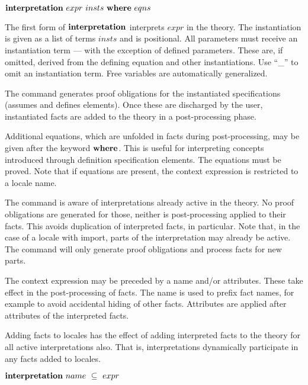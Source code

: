 \begin{descr}

\item [${\mathord{\mathbf{interpretation}}}~expr~insts~{\mathord{\mathbf{where}}}~eqns$]

  The first form of ${\mathord{\mathbf{interpretation}}}$ interprets $expr$ in
  the theory.  The instantiation is given as a list of terms $insts$
  and is positional.  All parameters must receive an instantiation
  term --- with the exception of defined parameters.  These are, if
  omitted, derived from the defining equation and other
  instantiations.  Use ``\_'' to omit an instantiation term.  Free
  variables are automatically generalized.

  The command generates proof obligations for the instantiated
  specifications (assumes and defines elements).  Once these are
  discharged by the user, instantiated facts are added to the theory in
  a post-processing phase.

  Additional equations, which are unfolded in facts during
  post-processing, may be given after the keyword
  ${\mathord{\mathbf{where}}}$.  This is useful for interpreting concepts
  introduced through definition specification elements.  The equations
  must be proved.  Note that if equations are present, the context
  expression is restricted to a locale name.

  The command is aware of interpretations already active in the
  theory.  No proof obligations are generated for those, neither is
  post-processing applied to their facts.  This avoids duplication of
  interpreted facts, in particular.  Note that, in the case of a
  locale with import, parts of the interpretation may already be
  active.  The command will only generate proof obligations and process
  facts for new parts.

  The context expression may be preceded by a name and/or attributes.
  These take effect in the post-processing of facts.  The name is used
  to prefix fact names, for example to avoid accidental hiding of
  other facts.  Attributes are applied after attributes of the
  interpreted facts.

  Adding facts to locales has the
  effect of adding interpreted facts to the theory for all active
  interpretations also.  That is, interpretations dynamically
  participate in any facts added to locales.

\item [${\mathord{\mathbf{interpretation}}}~name~\subseteq~expr$]


\end{descr}
